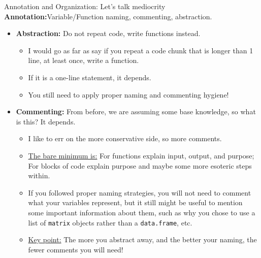 \documentclass[aspectratio=169,xcolor=dvipsnames]{beamer}
\begin{document}
\begin{frame}[t]{Annotation and Organization: Let's talk mediocrity}
  \textbf{Annotation:}\pause Variable/Function naming, commenting, abstraction.\pause
  \begin{itemize}
    \item \textbf{Abstraction:} \alert{Do not repeat code}, write functions instead.\pause
    \begin{itemize}
      \item I would go as far as say if you repeat a code chunk that is longer than 1 line, at least once, write a function.
      \item If it is a one-line statement, it depends.\pause
      \item \alert{You still need to apply proper naming and commenting hygiene!} \pause
    \end{itemize}
    \item \textbf{Commenting:} From before, we are assuming some base knowledge, so what is this? \pause It depends.\pause
    \begin{itemize}
      \item I like to err on the more conservative side, so more comments.\pause
      \item \underline{The bare minimum is:} For functions \alert{explain input, output, and purpose}; For blocks of code explain purpose and maybe some more esoteric steps within.\pause
      \item If you followed proper naming strategies, you will not need to comment what your variables represent, but it still might be useful to mention some important information about them, such as why you chose to use a list of \texttt{matrix} objects rather than a \texttt{data.frame}, etc.\pause
      \item \underline{Key point:} The more you abstract away, and the better your naming, the fewer comments you will need!
    \end{itemize}
  \end{itemize}

\end{frame}

\end{document}
